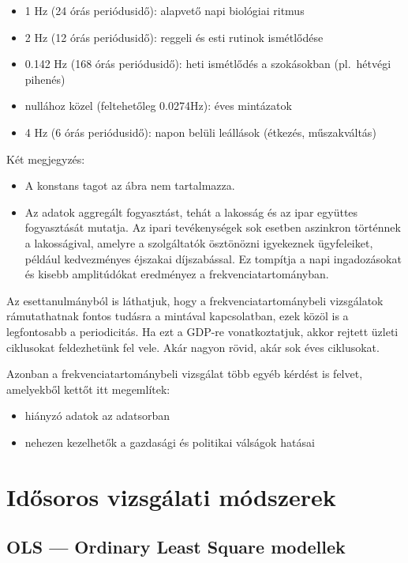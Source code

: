 \begin{itemize}
    \item 1 Hz (24 órás periódusidő): alapvető napi biológiai ritmus
    \item 2 Hz (12 órás periódusidő): reggeli és esti rutinok ismétlődése
    \item 0.142 Hz (168 órás periódusidő): heti ismétlődés a szokásokban (pl.\ hétvégi pihenés)
    \item nullához közel (feltehetőleg 0.0274Hz): éves mintázatok
    \item 4 Hz (6 órás periódusidő): napon belüli leállások (étkezés, műszakváltás)
\end{itemize}

Két megjegyzés:

\begin{itemize}
    \item A konstans tagot az ábra nem tartalmazza.
    \item Az adatok aggregált fogyasztást, tehát a lakosság és az ipar együttes fogyasztását mutatja. Az
          ipari tevékenységek sok esetben aszinkron történnek a lakosságival, amelyre a szolgáltatók
          ösztönözni igyekeznek ügyfeleiket, például kedvezményes éjszakai díjszabással. Ez tompítja a napi
          ingadozásokat és kisebb amplitúdókat eredményez a frekvenciatartományban.
\end{itemize}

Az esettanulmányból is láthatjuk, hogy a frekvenciatartománybeli vizsgálatok rámutathatnak fontos
tudásra a mintával kapcsolatban, ezek közöl is a legfontosabb a periodicitás. Ha ezt a GDP-re
vonatkoztatjuk, akkor rejtett üzleti ciklusokat feldezhetünk fel vele. Akár nagyon rövid, akár sok
éves ciklusokat.

Azonban a frekvenciatartománybeli vizsgálat több egyéb kérdést is felvet, amelyekből kettőt itt
megemlítek:

\begin{itemize}
    \item hiányzó adatok az adatsorban
    \item nehezen kezelhetők a gazdasági és politikai válságok hatásai
\end{itemize}

\section{Idősoros vizsgálati módszerek}

\subsection{OLS --- Ordinary Least Square modellek}

